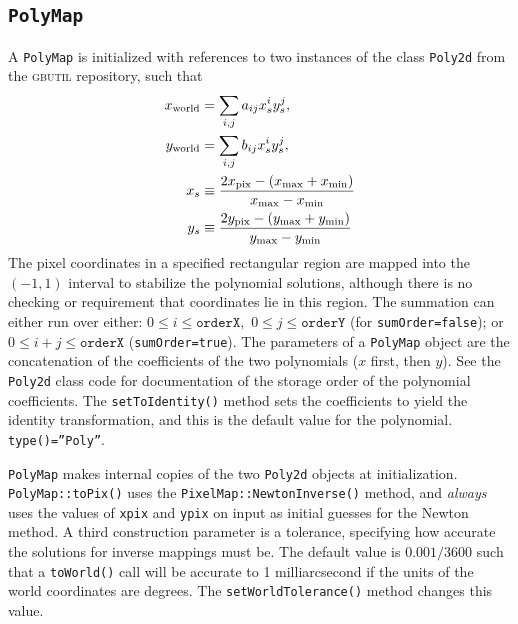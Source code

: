 \documentclass[11pt,preprint,flushrt]{aastex}
\begin{document}
\subsection{{\tt PolyMap}}
A {\tt PolyMap} is initialized with references to two instances of the class {\tt Poly2d} from the \textsc{gbutil} repository, such that
\begin{align}
x_{\rm world} & = \sum_{i,j} a_{ij} x_s^i y_s^j, \\
y_{\rm world} & = \sum_{i,j} b_{ij} x_s^i y_s^j, \\
x_s & \equiv \frac{2x_{\rm pix} - \left(x_{\rm max}+x_{\rm min}\right)}{ x_{\rm max}-x_{\rm min}}\\
y_s & \equiv \frac{2y_{\rm pix} - \left(y_{\rm max}+y_{\rm min}\right)}{ y_{\rm max}-y_{\rm min}}\\
\end{align}
The pixel coordinates in a specified rectangular region are mapped into the $(-1,1)$ interval to stabilize the polynomial solutions, although there is no checking or requirement that coordinates lie in this region.
The summation can either run over either: $0\le i \le \texttt{orderX},$  $0 \le j \le \texttt{orderY}$ (for \texttt{sumOrder=false}); or $0\le i+j \le \texttt{orderX}$ (\texttt{sumOrder=true}).
The parameters of a {\tt PolyMap} object are the concatenation of the coefficients of the two polynomials ($x$ first, then $y$).  
See the {\tt Poly2d} class code for documentation of the storage order of the polynomial coefficients. 
The {\tt setToIdentity()} method sets the coefficients to yield the identity transformation, and this is the default value for the polynomial. \texttt{type()=''Poly''}.

{\tt PolyMap} makes internal copies of the two {\tt Poly2d} objects at initialization. 
{\tt PolyMap::toPix()} uses the {\tt PixelMap::NewtonInverse()} method, and {\em always} uses the values of {\tt xpix} and {\tt ypix} on input as initial guesses for the Newton method.
A third construction parameter is a tolerance, specifying how accurate the solutions for inverse mappings must be.  The default value is $0.001/3600$ such that a {\tt toWorld()} call will be accurate to 1 milliarcsecond if the units of the world coordinates are degrees.  The {\tt setWorldTolerance()} method changes this value. 
\end{document}
